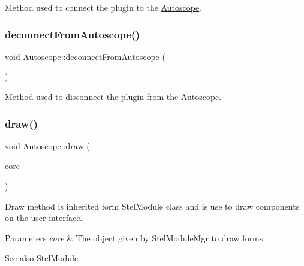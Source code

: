 Method used to connect the plugin to the \mbox{\hyperlink{class_autoscope}{Autoscope}}. 

\mbox{\label{class_autoscope_aafe64e11135903a1b83d16ffdd07d63e}} 
\subsubsection{\texorpdfstring{deconnectFromAutoscope()}{deconnectFromAutoscope()}}
{\footnotesize\ttfamily void Autoscope\+::deconnect\+From\+Autoscope (\begin{DoxyParamCaption}\item[{void}]{ }\end{DoxyParamCaption})}



Method used to disconnect the plugin from the \mbox{\hyperlink{class_autoscope}{Autoscope}}. 

\mbox{\label{class_autoscope_a268e2b524e0abd079f76c55e8443e907}} 
\subsubsection{\texorpdfstring{draw()}{draw()}}
{\footnotesize\ttfamily void Autoscope\+::draw (\begin{DoxyParamCaption}\item[{Stel\+Core $\ast$}]{core }\end{DoxyParamCaption})\hspace{0.3cm}{\ttfamily [virtual]}}



Draw method is inherited form Stel\+Module class and is use to draw components on the user interface. 


\begin{DoxyParams}{Parameters}
{\em core} & The object given by Stel\+Module\+Mgr to draw forms \\
\hline
\end{DoxyParams}
\begin{DoxySeeAlso}{See also}
Stel\+Module 
\end{DoxySeeAlso}
\mbox{\label{class_autoscope_af61a84b86f02cc55472c53cc79b025b2}} 
